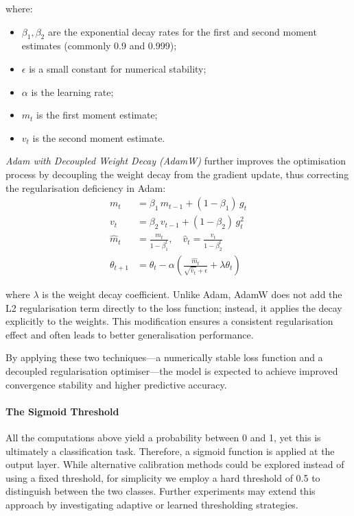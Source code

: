 \documentclass[12pt]{article}
\begin{document}
where:
\begin{itemize}
    \item $\beta_1, \beta_2$ are the exponential decay rates for the first and second moment estimates (commonly 0.9 and 0.999);
    \item $\epsilon$ is a small constant for numerical stability;
    \item $\alpha$ is the learning rate;
    \item $m_t$ is the first moment estimate;
    \item $v_t$ is the second moment estimate.
\end{itemize}

\textit{Adam with Decoupled Weight Decay (AdamW)} further improves the optimisation process by decoupling the weight decay from the gradient update, thus correcting the regularisation deficiency in Adam\cite{loshchilov2019adamw}:
\begin{equation}
\begin{aligned}
m_t &= \beta_1 \, m_{t-1} + (1 - \beta_1) \, g_t \\
v_t &= \beta_2 \, v_{t-1} + (1 - \beta_2) \, g_t^2 \\
\hat{m}_t &= \frac{m_t}{1 - \beta_1^t}, \quad
\hat{v}_t = \frac{v_t}{1 - \beta_2^t} \\
\theta_{t+1} &= \theta_t - \alpha \left( \frac{\hat{m}_t}{\sqrt{\hat{v}_t} + \epsilon} + \lambda \theta_t \right)
\end{aligned}
\end{equation}

where $\lambda$ is the weight decay coefficient.  
Unlike Adam, AdamW does not add the L2 regularisation term directly to the loss function; instead, it applies the decay explicitly to the weights. This modification ensures a consistent regularisation effect and often leads to better generalisation performance.

By applying these two techniques\;---\;a numerically stable loss function and a decoupled regularisation optimiser\;---\;the model is expected to achieve improved convergence stability and higher predictive accuracy.

\paragraph{The Sigmoid Threshold}

All the computations above yield a probability between 0 and 1, yet this is ultimately a classification task. Therefore, a sigmoid function is applied at the output layer. While alternative calibration methods could be explored instead of using a fixed threshold, for simplicity we employ a hard threshold of 0.5 to distinguish between the two classes. Further experiments may extend this approach by investigating adaptive or learned thresholding strategies.
\end{document}
